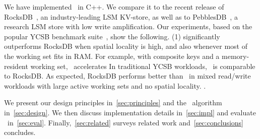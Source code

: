 We have implemented \sys\ in C++. We compare it to the recent release of RocksDB~\cite{RocksDB}, 
an industry-leading LSM KV-store, as well as to PebblesDB~\cite{PebblesDB}, a research LSM store 
with low write amplification. Our experiments, based on the popular YCSB benchmark suite~\cite{YCSB}, 
show the following. (1) \sys\/ significantly outperforms RocksDB when spatial  locality is high, and also 
whenever most of the working set fits in RAM. For example, with composite keys and a memory-resident 
working set, \sys\  accelerates  In traditional
YCSB workloads,  \sys\ is comparable to RocksDB. As expected, RocksDB performs better than 
\sys\ in mixed read/write workloads with large active working sets and no spatial locality. . 

We present our design principles in~\cref{sec:principles} and  the \sys\ algorithm 
in~\cref{sec:design}. We then discuss implementation details in~\cref{sec:impl} and evaluate 
\sys\ in~\cref{sec:eval}.  Finally,~\cref{sec:related}   surveys related work and~\cref{sec:conclusions}
concludes. 
